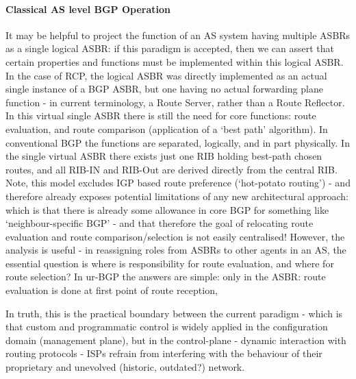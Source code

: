 \paragraph{Classical AS level BGP Operation}

It may be helpful to project the function of an AS system having multiple ASBRs as a single logical ASBR: if this paradigm is accepted, then we can assert that certain properties and functions must be implemented within this logical ASBR.  In the case of RCP, the logical ASBR was directly implemented as an actual single instance of a BGP ASBR, but one having no actual forwarding plane function - in current terminology, a Route Server, rather than a Route Reflector.  In this virtual single ASBR there is still the need for core functions: route evaluation, and route comparison (application of a `best path' algorithm).  In conventional BGP the functions are separated, logically, and in part physically.  In the single virtual ASBR there exists just one RIB holding best-path chosen routes, and all RIB-IN and RIB-Out are derived directly from the central RIB.  Note, this model excludes IGP based route preference (`hot-potato routing') - and therefore already exposes potential limitations of any new architectural approach: which is that there is already some allowance in core BGP for something like `neighbour-specific BGP' - and that therefore the goal of relocating route evaluation and route comparison/selection is not easily centralised!  However, the analysis is useful - in reassigning roles from ASBRs to other agents in an AS, the essential question is where is responsibility for route evaluation, and where for route selection?  In ur-BGP the answers are simple: only in the ASBR: route evaluation is done at first point of route reception, 


In truth, this is the practical boundary between the current paradigm - which is that custom and programmatic control is widely applied in the configuration domain (management plane), but in the control-plane - dynamic interaction with routing protocols - ISPs refrain from interfering with the behaviour of their proprietary and unevolved (historic, outdated?) network.

